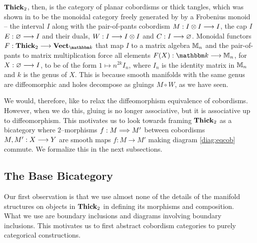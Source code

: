 \documentclass[./Thick_TQFTs_and_Quantum_Information.tex]{subfiles}
\begin{document}
$\textbf{Thick}_2$, then, is the category of planar cobordisms or thick tangles, which
was shown in \cite{NonCommTQFT} to be the monoidal category freely generated by
by a Frobenius monoid -- the interval $I$ along with the pair-of-pants cobordism
$M : I \otimes I \stackrel{}{\longrightarrow} I$, the cap $I$ $E : \varnothing \stackrel{}{\longrightarrow} I$ and their duals,
$W : I \stackrel{}{\longrightarrow} I \otimes I$ and $C : I \stackrel{}{\longrightarrow} \varnothing$. Monoidal functors
$F : \Thick_2 \to \Vect_{\K}$ that map $I$ to a matrix algebra $\mathbb{M}_n$
and the pair-of-pants to matrix multiplication force all elements
$F(X) : \K \to \M_n$, for $X : \varnothing \stackrel{}{\longrightarrow} I$, to be of the form
$1 \mapsto n^{2k}I_n$, where $I_n$ is the identity matrix in $\mathbb{M}_n$ and $k$ is
the genus of $X$. This is because smooth manifolds with the same genus are
diffeomorphic and holes decompose as gluings $M \circ W$, as we have seen.

We would, therefore, like to relax the diffeomorphism equivalence of cobordisms.
However, when we do this, gluing is no longer associative, but it is associative
up to diffeomorphism.  This motivates us to look towards framing $\textbf{Thick}_2$ as a
bicategory where $2$--morphisms $f : M \stackrel{}{\Longrightarrow} M'$ between cobordisms $M,
M' : X \stackrel{}{\longrightarrow} Y$ are smooth maps $f : M \to M'$ making diagram \eqref{diag:eqcob}
commute. We formalize this in the next subsections.

\subsection{The Base Bicategory}

Our first observation is that we use almost none of the details of the manifold
structures on objects in $\textbf{Thick}_2$ in defining its morphisms and composition.
What we use are boundary inclusions and diagrams involving boundary inclusions.
This motivates us to first abstract cobordism categories to purely categorical
constructions.
\end{document}
